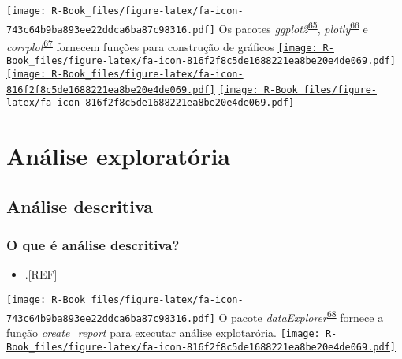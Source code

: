 \documentclass[
]{book}
\providecommand{\tightlist}{%
  \setlength{\itemsep}{0pt}\setlength{\parskip}{0pt}}
\begin{document}
\texttt{[image: R-Book\_files/figure-latex/fa-icon-743c64b9ba893ee22ddca6ba87c98316.pdf]} Os pacotes \emph{ggplot2}\textsuperscript{\protect\hyperlink{ref-ggplot2}{65}}, \emph{plotly}\textsuperscript{\protect\hyperlink{ref-plotly}{66}} e \emph{corrplot}\textsuperscript{\protect\hyperlink{ref-corrplot}{67}} fornecem funções para construção de gráficos \href{https://cran.r-project.org/web/packages/ggplot2/index.html}{\texttt{[image: R-Book\_files/figure-latex/fa-icon-816f2f8c5de1688221ea8be20e4de069.pdf]}} \href{https://cran.r-project.org/web/packages/plotly/index.html}{\texttt{[image: R-Book\_files/figure-latex/fa-icon-816f2f8c5de1688221ea8be20e4de069.pdf]}} \href{https://cran.r-project.org/web/packages/corrplot/index.html}{\texttt{[image: R-Book\_files/figure-latex/fa-icon-816f2f8c5de1688221ea8be20e4de069.pdf]}}

\hypertarget{analise-exploratoria}{%
\chapter{\texorpdfstring{\textbf{Análise exploratória}}{Análise exploratória}}\label{analise-exploratoria}}

\hypertarget{descritiva}{%
\section{Análise descritiva}\label{descritiva}}

\hypertarget{o-que-uxe9-anuxe1lise-descritiva}{%
\subsection{O que é análise descritiva?}\label{o-que-uxe9-anuxe1lise-descritiva}}

\begin{itemize}
\tightlist
\item
  .{[}REF{]}
\end{itemize}

\texttt{[image: R-Book\_files/figure-latex/fa-icon-743c64b9ba893ee22ddca6ba87c98316.pdf]} O pacote \emph{dataExplorer}\textsuperscript{\protect\hyperlink{ref-DataExplorer}{68}} fornece a função \emph{create\_report} para executar análise explotarória. \href{https://cran.r-project.org/web/packages/DataExplorer/index.html}{\texttt{[image: R-Book\_files/figure-latex/fa-icon-816f2f8c5de1688221ea8be20e4de069.pdf]}}
\end{document}
